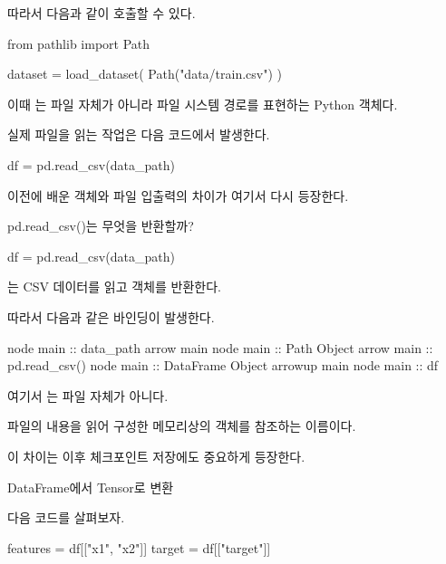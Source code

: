 따라서 다음과 같이 호출할 수 있다.

\begin{dhkcode}
from pathlib import Path

dataset = load_dataset(
    Path("data/train.csv")
)
\end{dhkcode}

이때 는 파일 자체가 아니라 파일 시스템 경로를 표현하는 Python 객체다.

실제 파일을 읽는 작업은 다음 코드에서 발생한다.

\begin{dhkcode}
df = pd.read_csv(data_path)
\end{dhkcode}

이전에 배운  객체와 파일 입출력의 차이가 여기서 다시 등장한다.

\begin{dhknote}
\begin{dhksmry}[centered]
pd.read_csv()는 무엇을 반환할까?
\end{dhksmry}
\end{dhknote}

\begin{dhkcode}
df = pd.read_csv(data_path)
\end{dhkcode}

는 CSV 데이터를 읽고  객체를 반환한다.

따라서 다음과 같은 바인딩이 발생한다.

\begin{dhkbranch}[in=8]
node main :: data_path
arrow main
node main :: Path Object
arrow main :: pd.read_csv()
node main :: DataFrame Object
arrowup main
node main :: df
\end{dhkbranch}

여기서 는 파일 자체가 아니다.

파일의 내용을 읽어 구성한 메모리상의  객체를 참조하는 이름이다.

이 차이는 이후 체크포인트 저장에도 중요하게 등장한다.

\begin{dhknote}
\begin{dhksmry}[centered]
DataFrame에서 Tensor로 변환
\end{dhksmry}
\end{dhknote}

다음 코드를 살펴보자.

\begin{dhkcode}
features = df[["x1", "x2"]]
target = df[["target"]]
\end{dhkcode}

